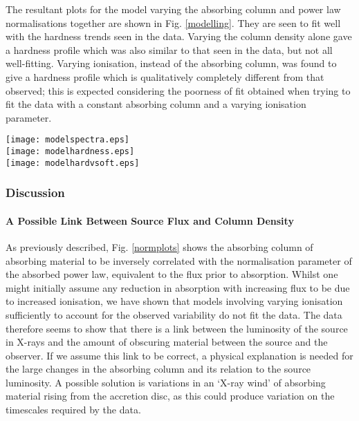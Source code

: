 \documentclass[letters,useAMS,usenatbib]{samnote}
\begin{document}
The resultant plots for the model varying the absorbing column and power law normalisations together are shown in Fig. \ref{modelling}. They are seen to fit well with the
hardness trends seen in the data. Varying the column density alone gave a hardness profile which was also similar to that seen in the data, but not all well-fitting.
Varying ionisation, instead of the absorbing column, was found to give a hardness profile which is qualitatively completely different from that observed; this is
expected considering the poorness of fit obtained when trying to fit the data with a constant absorbing column and a varying ionisation parameter.


\begin{figure*}
	
	\texttt{[image: modelspectra.eps]} \\
	\texttt{[image: modelhardness.eps]} \\
	\hspace{20pt}
	\texttt{[image: modelhardvsoft.eps]} \\
	
	\caption{Top: A sample of many simulated spectra with a
		varying absorbing absorbing column. Middle: The 
		corresponding hard flux against hardness plot. 
		Bottom: The corresponding hard flux against soft 
		flux plot.}
	\label{modelling}
\end{figure*}


\subsubsection{Discussion}

\paragraph{A Possible Link Between Source Flux and Column Density}


	

				
As previously described, Fig. \ref{normplots} shows the absorbing column of absorbing material to be inversely correlated with the normalisation parameter of the absorbed
power law, equivalent to the flux prior to absorption. Whilst one might initially assume any reduction in absorption with increasing flux to be due to increased
ionisation, we have shown that models involving varying ionisation sufficiently to account for the observed variability do not fit the data. The data therefore seems to
show that there is a link between the luminosity of the source in X-rays and the amount of obscuring material between the source and the observer. If we assume this
link to be correct, a physical explanation is needed for the large changes in the absorbing column and its relation to the source luminosity. A possible solution is
variations in an `X-ray wind' of absorbing material rising from the accretion disc, as this could produce variation on the timescales required by the data. 
\end{document}
